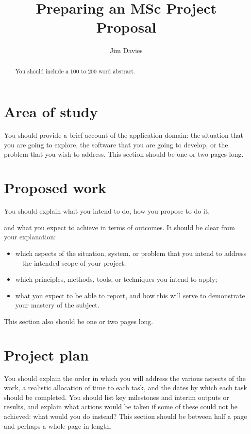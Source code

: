 \documentclass[proposal]{softeng}
\title{Preparing an MSc Project Proposal}
\author{Jim Davies}
\begin{document}
\maketitle

\begin{abstract}
You should include a 100 to 200 word abstract.
\end{abstract}
 
\section{Area of study}

You should provide a brief account of the application domain: the
situation that you are going to explore, the software that you are
going to develop, or the problem that you wish to address.  This
section should be one or two pages long. 

\section{Proposed work}

You should explain what you intend to do, how you propose to do it,

and what you expect to achieve in terms of outcomes.  It should be
clear from your explanation:
\begin{itemize}
\item which aspects of the situation, system, or problem that you intend
  to address---the intended scope of your project;
\item which principles, methods, tools, or techniques you intend to
  apply;
\item what you expect to be able to report, and how this will serve to
  demonstrate your mastery of the subject.
\end{itemize}
This section also should be one or two pages long. 

\section{Project plan}

You should explain the order in which you will address the various
aspects of the work, a realistic allocation of time to each task, and
the dates by which each task should be completed.  You should list key
milestones and interim outputs or results, and explain what actions
would be taken if some of these could not be achieved: what would you
do instead?   This section should be between half a page and perhaps a
whole page in length.  
\end{document}
